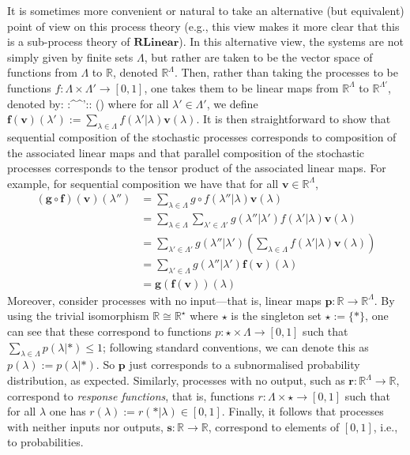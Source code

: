 \documentclass[10pt,twocolumn,aps,groupedaddress,nofootinbib]{revtex4}
\newcommand\RL{\mathbf{RLinear}}
\begin{document}
It is sometimes more convenient or natural to take an alternative (but equivalent) point of view on this process theory (e.g., this view makes it more clear that this is a sub-process theory of $\RL$). In this alternative view, the systems are not simply given by finite sets $\Lambda$, but rather are taken to be the vector space of functions from $\Lambda$ to $\mathds{R}$, denoted $\mathds{R}^\Lambda$. Then, rather than taking the processes to be functions $f:\Lambda\times \Lambda'\to[0,1]$, one takes them to be linear maps from $\mathds{R}^\Lambda$ to $\mathds{R}^{\Lambda'}$, denoted by:
\beq
{}:^\Lambda \to {}^{\Lambda'}:: \mapsto {}()
\eeq
where for all $\lambda'\in\Lambda'$, we define
$\mathbf{f(v)}(\lambda') := \sum_{\lambda\in\Lambda} f(\lambda'|\lambda)\mathbf{v}(\lambda)$. It is then straightforward to show that sequential composition of the stochastic processes corresponds to composition of the associated linear maps and that parallel composition of the stochastic processes corresponds to the tensor product of the associated linear maps. For example, for sequential composition we have that for all $\mathbf{v}\in\mathds{R}^\Lambda$,
\begin{align}
\mathbf{(g\circ f)(v)}(\lambda'') &= \sum_{\lambda\in\Lambda}g\circ f(\lambda''|\lambda)\mathbf{v}(\lambda) \\
&= \sum_{\lambda\in\Lambda}\sum_{\lambda'\in\Lambda'}g(\lambda''|\lambda')f(\lambda'|\lambda)\mathbf{v}(\lambda)\\
&= \sum_{\lambda'\in\Lambda'}g(\lambda''|\lambda')\left(\sum_{\lambda\in\Lambda}f(\lambda'|\lambda)\mathbf{v}(\lambda)\right)\\
&= \sum_{\lambda'\in\Lambda}g(\lambda''|\lambda')\mathbf{f(v)}(\lambda)\\
&= \mathbf{g(f(v))}(\lambda)
\end{align}
Moreover, consider processes with no input---that is, linear maps $\mathbf{p}:\mathds{R}\to\mathds{R}^\Lambda$. By using the trivial isomorphism $\mathds{R}\cong \mathds{R}^\star$ where $\star$ is the singleton set $\star:=\{*\}$, one can see that these correspond to functions $p:\star\times\Lambda\to[0,1]$ such that $\sum_{\lambda\in\Lambda}p(\lambda|*)\leq 1$; following standard conventions, we can denote this as $p(\lambda):= p(\lambda|*)$. So $\mathbf{p}$ just corresponds to a subnormalised probability distribution, as expected. Similarly, processes with no output, such as $\mathbf{r}:\mathds{R}^\Lambda\to\mathds{R}$,  correspond to \emph{response functions}, that is, functions $r:\Lambda\times\star\to[0,1]$ such that for all $\lambda$ one has $r(\lambda):=r(*|\lambda) \in [0,1]$. Finally, it follows that processes with neither inputs nor outputs, $\mathbf{s}:\mathds{R}\to\mathds{R}$, correspond to elements of $[0,1]$, i.e., to probabilities.
\end{document}
